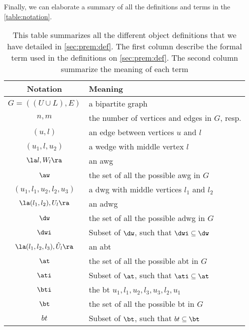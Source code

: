 Finally, we can elaborate a summary of all the definitions and terms in the \autoref{table:notation}.

\begin{table}[!ht]
\centering
\begin{tabular}{|c|l|} \hline
\textbf{Notation} & \textbf{Meaning}\\ \hline
$G=((U\cup L),E)$ & a bipartite graph\\  \hline
$n,m$ & the number of vertices and edges in $G$, resp.\\  \hline
$(u,l)$ & an edge between vertices $u$ and $l$\\  \hline
$(u_1,l,u_2)$ & a wedge with  middle vertex $l$\\  \hline
$\la l, W_l \ra$ & an \acrshort{awg}\\  \hline
$\aw$ & the set of all the possible \acrshort{awg} in $G$\\  \hline
$(u_1,l_1,u_2,l_2,u_3)$ & a \acrshort{dwg} with middle vertices $l_1$ and $l_2$\\  \hline 
$\la (l_1, l_2), U_l \ra$ & an \acrshort{adwg}\\  \hline
$\dw$ & the set of all the possible \acrshort{adwg} in $G$\\  \hline
$\dwi$ & Subset of $\dw$, such that $\dwi \subseteq \dw$ \\  \hline
$\la (l_1, l_2,l_3), \hat{U}_l \ra$ & an \acrshort{abt}\\  \hline
$\at$ & the set of all the possible \acrshort{abt} in $G$ \\  \hline
$\ati$ & Subset of $\at$, such that $\ati \subseteq \at$ \\  \hline 
$\bti$ & the \acrshort{bt} $u_1,l_1,u_2,l_3,u_3,l_2,u_1$\\  \hline
$\bt$ & the set of all the possible \acrshort{bt} in $G$ \\  \hline
$bt$ & Subset of $\bt$, such that $bt \subseteq \bt$ \\  \hline
\end{tabular}
\caption[{[\acrshort{iebt}] Summary of notations and their meanings}]{This table summarizes all the different object definitions that we have detailed in \autoref{sec:prem:def}. The first column describe the formal term used in the definitions on \autoref{sec:prem:def}. The second column summarize the meaning of each term}
\label{table:notation}
\end{table}
      
